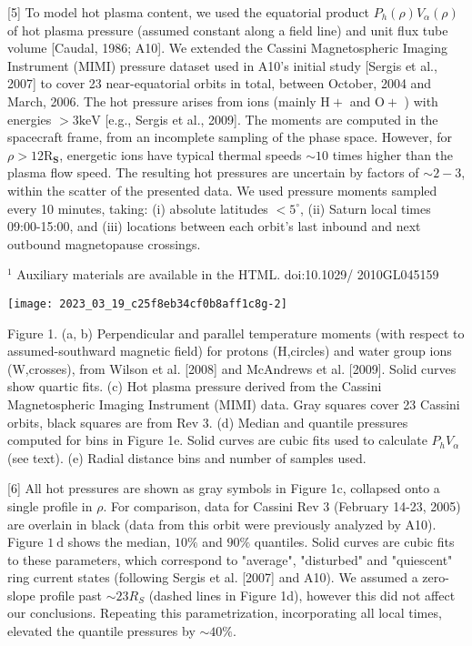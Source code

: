 \documentclass[10pt]{article}
\begin{document}
[5] To model hot plasma content, we used the equatorial product $P_{h}(\rho) V_{\alpha}(\rho)$ of hot plasma pressure (assumed constant along a field line) and unit flux tube volume [Caudal, 1986; A10]. We extended the Cassini Magnetospheric Imaging Instrument (MIMI) pressure dataset used in A10's initial study [Sergis et al., 2007] to cover 23 near-equatorial orbits in total, between October, 2004 and March, 2006. The hot pressure arises from ions (mainly $\mathrm{H}+$ and $\mathrm{O}+$ ) with energies $>3 \mathrm{keV}$ [e.g., Sergis et al., 2009]. The moments are computed in the spacecraft frame, from an incomplete sampling of the phase space. However, for $\rho>12 \mathrm{R}_{\mathbf{S}}$, energetic ions have typical thermal speeds $\sim 10$ times higher than the plasma flow speed. The resulting hot pressures are uncertain by factors of $\sim 2-3$, within the scatter of the presented data. We used pressure moments sampled every 10 minutes, taking: (i) absolute latitudes $<5^{\circ}$, (ii) Saturn local times 09:00-15:00, and (iii) locations between each orbit's last inbound and next outbound magnetopause crossings.

${ }^{1}$ Auxiliary materials are available in the HTML. doi:10.1029/ 2010GL045159

\begin{center}
\texttt{[image: 2023\_03\_19\_c25f8eb34cf0b8aff1c8g-2]}
\end{center}

Figure 1. (a, b) Perpendicular and parallel temperature moments (with respect to assumed-southward magnetic field) for protons (H,circles) and water group ions (W,crosses), from Wilson et al. [2008] and McAndrews et al. [2009]. Solid curves show quartic fits. (c) Hot plasma pressure derived from the Cassini Magnetospheric Imaging Instrument (MIMI) data. Gray squares cover 23 Cassini orbits, black squares are from Rev 3. (d) Median and quantile pressures computed for bins in Figure 1e. Solid curves are cubic fits used to calculate $P_{h} V_{\alpha}$ (see text). (e) Radial distance bins and number of samples used.

[6] All hot pressures are shown as gray symbols in Figure 1c, collapsed onto a single profile in $\rho$. For comparison, data for Cassini Rev 3 (February 14-23, 2005) are overlain in black (data from this orbit were previously analyzed by A10). Figure $1 \mathrm{~d}$ shows the median, $10 \%$ and $90 \%$ quantiles. Solid curves are cubic fits to these parameters, which correspond to "average", "disturbed" and "quiescent" ring current states (following Sergis et al. [2007] and A10). We assumed a zero-slope profile past $\sim 23 R_{S}$ (dashed lines in Figure 1d), however this did not affect our conclusions. Repeating this parametrization, incorporating all local times, elevated the quantile pressures by $\sim 40 \%$.
\end{document}
